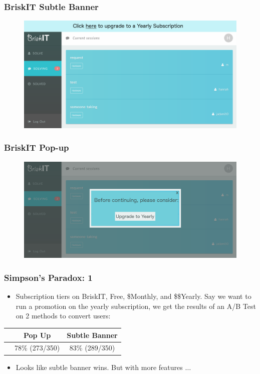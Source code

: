 \documentclass{beamer}
\begin{document}

\begin{frame}
	\frametitle{BriskIT Subtle Banner}
	\begin{figure}
		\centering
		\includegraphics[width=1\linewidth]{briskit_banner}
	\end{figure}
\end{frame}


\begin{frame}
	\frametitle{BriskIT Pop-up}
	\begin{figure}
		\centering
		\includegraphics[width=1\linewidth]{briskit_popup}
	\end{figure}
\end{frame}


\begin{frame}
	\frametitle{Simpson's Paradox: 1}
	\begin{itemize}
		\item Subscription tiers on BriskIT, Free, \$Monthly, and \$\$Yearly. Say we want to run a promotion on the yearly subscription, we get the results of an A/B Test on 2 methods to convert users:
	\end{itemize}
	\begin{table}
		\begin{tabular}{|c|c|c|}
			 & Pop Up & Subtle Banner
			\onslide<1>{\\\hline} Users (Converted/Total) & 78\% (273/350) & 83\% (289/350)
		\end{tabular}
	\end{table}
	\begin{itemize}
		\item Looks like subtle banner wins. But with more features $\dots$
	\end{itemize}
\end{frame}
\end{document}
